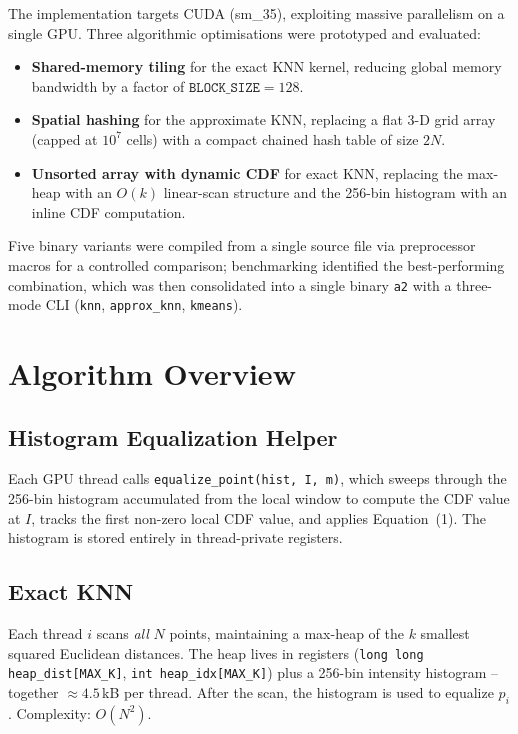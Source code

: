 \documentclass[11pt,a4paper]{article}
\begin{document}
The implementation targets CUDA (sm\_35), exploiting massive parallelism on a
single GPU.  Three algorithmic optimisations were prototyped and evaluated:
\begin{itemize}
  \item \textbf{Shared-memory tiling} for the exact KNN kernel, reducing global
        memory bandwidth by a factor of $\mathtt{BLOCK\_SIZE}=128$.
  \item \textbf{Spatial hashing} for the approximate KNN, replacing a flat 3-D
        grid array (capped at $10^7$ cells) with a compact chained hash table
        of size $2N$.
  \item \textbf{Unsorted array with dynamic CDF} for exact KNN, replacing the
        max-heap with an $O(k)$ linear-scan structure and the 256-bin histogram
        with an inline CDF computation.
\end{itemize}

Five binary variants were compiled from a single source file via preprocessor
macros for a controlled comparison; benchmarking identified the best-performing
combination, which was then consolidated into a single binary \texttt{a2} with
a three-mode CLI (\texttt{knn}, \texttt{approx\_knn}, \texttt{kmeans}).

\section{Algorithm Overview}

\subsection{Histogram Equalization Helper}

Each GPU thread calls \texttt{equalize\_point(hist, I, m)}, which sweeps
through the 256-bin histogram accumulated from the local window to compute the
CDF value at $I$, tracks the first non-zero local CDF value, and applies
Equation~(1).  The histogram is stored entirely in thread-private registers.

\subsection{Exact KNN}

Each thread $i$ scans \emph{all} $N$ points, maintaining a max-heap of the $k$
smallest squared Euclidean distances.  The heap lives in registers
(\texttt{long long heap\_dist[MAX\_K]}, \texttt{int heap\_idx[MAX\_K]}) plus a
256-bin intensity histogram -- together $\approx 4.5$\,kB per thread.  After
the scan, the histogram is used to equalize $p_i$.  Complexity: $O(N^2)$.
\end{document}
